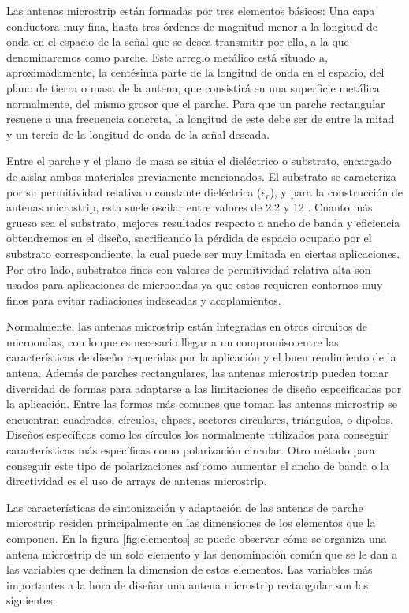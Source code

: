 \par Las antenas microstrip están formadas por tres elementos básicos: Una capa conductora muy fina, hasta tres órdenes de magnitud menor a la longitud de onda en el espacio de la señal que se desea transmitir por ella, a la que denominaremos como parche. Este arreglo metálico está situado a, aproximadamente, la centésima parte de la longitud de onda en el espacio, del plano de tierra o masa de la antena, que consistirá en una superficie metálica normalmente, del mismo grosor que el parche. Para que un parche rectangular resuene a una frecuencia concreta, la longitud de este debe ser de entre la mitad y un tercio de la longitud de onda de la señal deseada.
\\
\par Entre el parche y el plano de masa se sitúa el dieléctrico o substrato, encargado de aislar ambos materiales previamente mencionados. El substrato se caracteriza por su permitividad relativa o constante dieléctrica ($\epsilon_{r}$), y para la construcción de antenas microstrip, esta suele oscilar entre valores de 2.2 y 12 . Cuanto más grueso sea el substrato, mejores resultados respecto a ancho de banda y eficiencia obtendremos en el diseño, sacrificando la pérdida de espacio ocupado por el substrato correspondiente, la cual puede ser muy limitada en ciertas aplicaciones. Por otro lado, substratos finos con valores de permitividad relativa alta son usados para aplicaciones de microondas ya que estas requieren contornos muy finos para evitar radiaciones indeseadas y acoplamientos.
\\
\par Normalmente, las antenas microstrip están integradas en otros circuitos de microondas, con lo que es necesario llegar a un compromiso entre las características de diseño requeridas por la aplicación y el buen rendimiento de la antena. Además de parches rectangulares, las antenas microstrip pueden tomar diversidad de formas para adaptarse a las limitaciones de diseño especificadas por la aplicación. Entre las formas más comunes que toman las antenas microstrip se encuentran cuadrados, círculos, elipses, sectores circulares, triángulos, o dipolos. Diseños específicos como los círculos los normalmente utilizados para conseguir características más específicas como polarización circular. Otro método para conseguir este tipo de polarizaciones así como aumentar el ancho de banda o la directividad es el uso de arrays de antenas microstrip. 
\\
\par Las características de sintonización y adaptación de las antenas de parche microstrip residen principalmente en las dimensiones de los elementos que la componen. En la figura \ref{fig:elementos} se puede observar cómo se organiza una antena microstrip de un solo elemento y las denominación común que se le dan a las variables que definen la dimension de estos elementos. Las variables más importantes a la hora de diseñar una antena microstrip rectangular son los siguientes:


